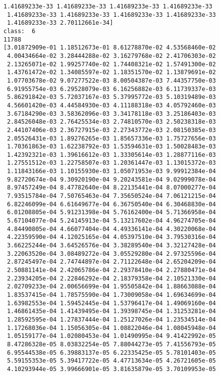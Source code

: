 \documentclass[11pt]{article}
\begin{document}
\begin{Verbatim}[commandchars=\\\{\}]
 1.41689233e-33 1.41689233e-33 1.41689233e-33 1.41689233e-33
 1.41689233e-33 1.41689233e-33 1.41689233e-33 1.41689233e-33
 1.41689233e-33 2.70112661e-34]
class:  6
11788
[3.01872909e-01 1.18512673e-01 8.61278870e-02 4.53568460e-02
 4.00434664e-02 3.28444288e-02 3.16279768e-02 2.41706303e-02
 2.13265071e-02 1.99257740e-02 1.74408321e-02 1.57491300e-02
 1.43761472e-02 1.34085597e-02 1.18351570e-02 1.13879691e-02
 1.07703678e-02 9.07277522e-03 8.00504387e-03 7.44357750e-03
 6.91955754e-03 6.29528079e-03 6.16256882e-03 6.11739337e-03
 5.86291842e-03 5.72037167e-03 5.37995772e-03 5.10319489e-03
 4.56601420e-03 4.44584930e-03 4.11188318e-03 4.05792460e-03
 3.67184290e-03 3.58362096e-03 3.34178118e-03 3.25186403e-03
 2.84526048e-03 2.76425534e-03 2.74810570e-03 2.50238318e-03
 2.44107406e-03 2.36727915e-03 2.27343772e-03 2.08150385e-03
 2.05526431e-03 1.89276265e-03 1.85657336e-03 1.75727656e-03
 1.70361863e-03 1.62238792e-03 1.53594631e-03 1.50028483e-03
 1.42392321e-03 1.39616612e-03 1.33305614e-03 1.28877116e-03
 1.27551512e-03 1.22758507e-03 1.20361447e-03 1.13015372e-03
 1.11843166e-03 1.10155930e-03 1.05071953e-03 9.99912384e-04
 9.82720674e-04 9.30920190e-04 9.20243581e-04 9.02999078e-04
 8.97457249e-04 8.47782640e-04 8.22135441e-04 8.07000277e-04
 7.93515784e-04 7.50765463e-04 7.35650524e-04 7.06121215e-04
 6.82246099e-04 6.61649677e-04 6.36750540e-04 6.30468830e-04
 6.01208805e-04 5.91231398e-04 5.76162400e-04 5.71366958e-04
 5.67104077e-04 5.24145913e-04 5.13217602e-04 4.96274705e-04
 4.84490805e-04 4.66077404e-04 4.49336141e-04 4.30220068e-04
 4.22359590e-04 4.12025165e-04 4.05397510e-04 3.79530316e-04
 3.66225244e-04 3.64526576e-04 3.38289540e-04 3.32127428e-04
 3.22063520e-04 3.08489272e-04 3.05529280e-04 2.97325596e-04
 2.87245497e-04 2.74744897e-04 2.71122648e-04 2.65204209e-04
 2.50881141e-04 2.42065786e-04 2.29378410e-04 2.27880471e-04
 2.23934205e-04 2.22846292e-04 2.18379358e-04 2.10521330e-04
 2.02709233e-04 2.00656699e-04 1.95505842e-04 1.88663088e-04
 1.83537415e-04 1.78575590e-04 1.73009058e-04 1.69634699e-04
 1.63982553e-04 1.59452445e-04 1.53796417e-04 1.49069160e-04
 1.46861435e-04 1.41439495e-04 1.39398745e-04 1.31253281e-04
 1.28592595e-04 1.27837444e-04 1.25127026e-04 1.23534514e-04
 1.17268036e-04 1.15056305e-04 1.08822046e-04 1.08045948e-04
 1.05159177e-04 1.02080453e-04 1.01490995e-04 9.41422992e-05
 8.47286328e-05 8.03832254e-05 7.88044273e-05 7.41556793e-05
 6.95544538e-05 6.39883137e-05 6.22335425e-05 5.78101403e-05
 5.59155353e-05 5.39417722e-05 4.47713634e-05 4.26721605e-05
 4.10293944e-05 3.99666901e-05 3.81635879e-05 3.70109953e-05

\end{Verbatim}
\end{document}

